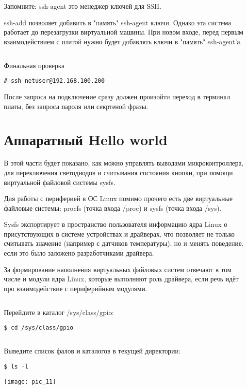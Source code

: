 \begin{Notes}{Запомните:}
ssh-agent это менеджер ключей для SSH. 

ssh-add позволяет добавить в "память" ssh-agent ключи. Однако эта система работает до перезагрузки виртуальной машины. При новом входе, перед первым взаимодействием с платой нужно будет добавлять ключи в "память" ssh-agent'а.
\end{Notes}

\subsection{}Финальная проверка
\begin{lstlisting}[style=bash]
# ssh netuser@192.168.100.200
\end{lstlisting}
После запроса на подключение сразу должен произойти переход в терминал платы, без запроса пароля или секртеной фразы.

\section{Аппаратный Hello world }

В этой части будет показано, как можно управлять выводами микроконтроллера, для переключения светодиодов и считывания состояния кнопки, при помощи виртуальной файловой системы sysfs.

Для работы с периферией в ОС Linux помимо прочего есть две виртуальные файловые системы: procfs (точка входа /proc) и sysfs (точка входа /sys).  

Sysfs экспортирует в пространство пользователя информацию ядра Linux о присутствующих в системе устройствах и драйверах, что позволяет не только считывать значение (например с датчиков температуры), но и менять поведение, если это было заложено разработчиками драйвера.

За формирование наполнения виртуальных файловых систем отвечают в том числе и модули ядра Linux, которые выполняют роль драйвера, если речь идёт про взаимодействие с периферийным модулями.

\subsection{}Перейдите в каталог /sys/class/gpio:
\begin{lstlisting}[style=bash]
$ cd /sys/class/gpio
\end{lstlisting}

\subsection{}Выведите список фалов и каталогов в текущей директории: 
\begin{lstlisting}[style=bash]
$ ls -l
\end{lstlisting}
\begin{center}
	\texttt{[image: pic\_11]}
\end{center}

